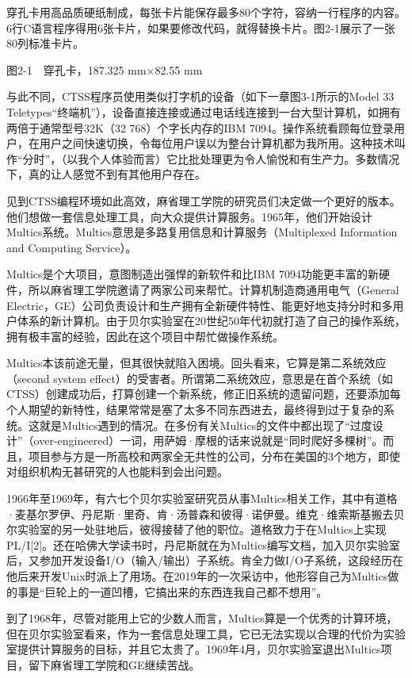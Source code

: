 \documentclass[a4paper,12pt,UTF8,twoside]{ctexbook}
\begin{document}
{穿孔卡用高品质硬纸制成，每张卡片能保存最多80个字符，容纳一行程序的内容。6行C语言程序得用6张卡片，如果要修改代码，就得替换卡片。图2-1展示了一张80列标准卡片。



图2-1　穿孔卡，187.325 mm×82.55 mm

与此不同，CTSS程序员使用类似打字机的设备（如下一章图3-1所示的Model 33 Teletypes“终端机”），设备直接连接或通过电话线连接到一台大型计算机，如拥有两倍于通常型号32K（32 768）个字长内存的IBM 7094。操作系统看顾每位登录用户，在用户之间快速切换，令每位用户误以为整台计算机都为我所用。这种技术叫作“分时”，（以我个人体验而言）它比批处理更为令人愉悦和有生产力。多数情况下，真的让人感觉不到有其他用户存在。

见到CTSS编程环境如此高效，麻省理工学院的研究员们决定做一个更好的版本。他们想做一套信息处理工具，向大众提供计算服务。1965年，他们开始设计Multics系统。Multics意思是多路复用信息和计算服务（Multiplexed Information and Computing Service）。

Multics是个大项目，意图制造出强悍的新软件和比IBM 7094功能更丰富的新硬件，所以麻省理工学院邀请了两家公司来帮忙。计算机制造商通用电气（General Electric，GE）公司负责设计和生产拥有全新硬件特性、能更好地支持分时和多用户体系的新计算机。由于贝尔实验室在20世纪50年代初就打造了自己的操作系统，拥有极丰富的经验，因此在这个项目中帮忙做操作系统。

Multics本该前途无量，但其很快就陷入困境。回头看来，它算是第二系统效应（second system effect）的受害者。所谓第二系统效应，意思是在首个系统（如CTSS）创建成功后，打算创建一个新系统，修正旧系统的遗留问题，还要添加每个人期望的新特性，结果常常是塞了太多不同东西进去，最终得到过于复杂的系统。这就是Multics遇到的情况。在多份有关Multics的文件中都出现了“过度设计”（over-engineered）一词，用萨姆·摩根的话来说就是“同时爬好多棵树”。而且，项目参与方是一所高校和两家全无共性的公司，分布在美国的3个地方，即使对组织机构无甚研究的人也能料到会出问题。

1966年至1969年，有六七个贝尔实验室研究员从事Multics相关工作，其中有道格·麦基尔罗伊、丹尼斯·里奇、肯·汤普森和彼得·诺伊曼。维克·维索斯基搬去贝尔实验室的另一处驻地后，彼得接替了他的职位。道格致力于在Multics上实现PL/I[2]。还在哈佛大学读书时，丹尼斯就在为Multics编写文档，加入贝尔实验室后，又参加开发设备I/O（输入/输出）子系统。肯全力做I/O子系统，这段经历在他后来开发Unix时派上了用场。在2019年的一次采访中，他形容自己为Multics做的事是“巨轮上的一道凹槽，它搞出来的东西连我自己都不想用”。

到了1968年，尽管对能用上它的少数人而言，Multics算是一个优秀的计算环境，但在贝尔实验室看来，作为一套信息处理工具，它已无法实现以合理的代价为实验室提供计算服务的目标，并且它太贵了。1969年4月，贝尔实验室退出Multics项目，留下麻省理工学院和GE继续苦战。

}
\end{document}
